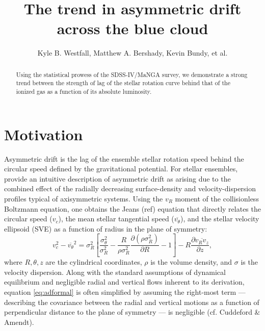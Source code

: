 \documentclass[apj,iop,revtex4,numberedappendix]{emulateapj}
\begin{document}
\title{ The trend in asymmetric drift across the blue cloud }

\author{ Kyle B. Westfall, Matthew A.
Bershady, Kevin Bundy, et al. }




\begin{abstract}

Using the statistical prowess of the SDSS-IV/MaNGA survey, we
demonstrate a strong trend between the strength of lag of the stellar
rotation curve behind that of the ionized gas as a function of its
absolute luminosity.

\end{abstract}


\section{ Motivation }
\label{sec:intro}

Asymmetric drift is the lag of the ensemble stellar rotation speed
behind the circular speed defined by the gravitational potential.  For
stellar ensembles, \citet[][Section 4.4.3]{2008gady.book.....B} provide
an intuitive description of asymmetric drift as arising due to the
combined effect of the radially decreasing surface-density and
velocity-dispersion profiles typical of axisymmetric systems.  Using the
$v_R$ moment of the collisionless Boltzmann equation, one obtains the
Jeans (ref) equation that directly relates the circular speed ($v_c$),
the mean stellar tangential speed ($\overline{v_\theta}$), and the
stellar velocity ellipsoid (SVE) as a function of radius in the plane of
symmetry:
%
\begin{equation}
%
v_c^2 - \overline{v_\theta}^2 = \sigma_R^2\left[
\frac{\sigma_\theta^2}{\sigma_R^2} -
\frac{R}{\rho\sigma_R^2}\frac{\partial(\rho\sigma_R^2)}{\partial R} -
1\right] - R\frac{\partial\overline{v_R v_z}}{\partial z},
%
\label{eq:adformal}
%
\end{equation}
%
where $R,\theta,z$ are the cylindrical coordinates, $\rho$ is the volume
density, and $\sigma$ is the velocity dispersion.  Along with the
standard assumptions of dynamical equilibrium and negligible radial and
vertical flows inherent to its derivation, equation \ref{eq:adformal} is
often simplified by assuming the right-most term --- describing the
covariance between the radial and vertical motions as a function of
perpendicular distance to the plane of symmetry --- is negligible (cf.
Cuddeford \& Amendt).
\end{document}
